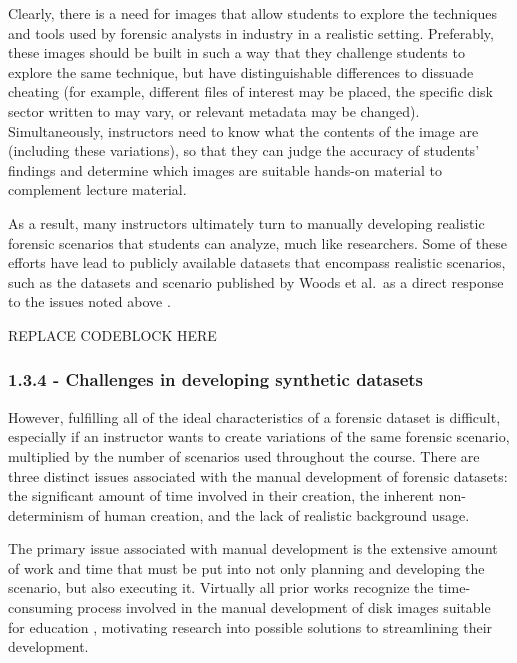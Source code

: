 Clearly, there is a need for images that allow students to explore the
techniques and tools used by forensic analysts in industry in a
realistic setting. Preferably, these images should be built in such a
way that they challenge students to explore the same technique, but have
distinguishable differences to dissuade cheating (for example, different
files of interest may be placed, the specific disk sector written to may
vary, or relevant metadata may be changed). Simultaneously, instructors
need to know what the contents of the image are (including these
variations), so that they can judge the accuracy of students' findings
and determine which images are suitable hands-on material to complement
lecture material.

As a result, many instructors ultimately turn to manually developing
realistic forensic scenarios that students can analyze, much like
researchers. Some of these efforts have lead to publicly available
datasets that encompass realistic scenarios, such as the datasets and
scenario published by Woods et al.~as a direct response to the issues
noted above \cite{woodsCreatingRealisticCorpora2011}.

REPLACE CODEBLOCK HERE

\subsubsection{1.3.4 - Challenges in developing synthetic
datasets}\label{challenges-in-developing-synthetic-datasets}

However, fulfilling all of the ideal characteristics of a forensic
dataset is difficult, especially if an instructor wants to create
variations of the same forensic scenario, multiplied by the number of
scenarios used throughout the course. There are three distinct issues
associated with the manual development of forensic datasets: the
significant amount of time involved in their creation, the inherent
non-determinism of human creation, and the lack of realistic background
usage.

The primary issue associated with manual development is the extensive
amount of work and time that must be put into not only planning and
developing the scenario, but also executing it. Virtually all prior
works recognize the time-consuming process involved in the manual
development of disk images suitable for education
\cite{adelsteinAutomaticallyCreatingRealistic2005,gobelForTraceHolisticForensic2022,guptaDigitalForensicsLab2022,mochForensicImageGenerator2009,russellForensicImageDescription2012,scanlonEviPlantEfficientDigital2017,woodsCreatingRealisticCorpora2011},
motivating research into possible solutions to streamlining their
development.

